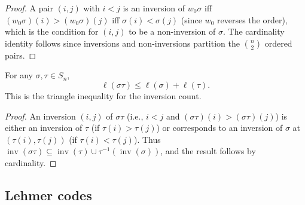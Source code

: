 \begin{proof}
\leanok
A pair $(i,j)$ with $i < j$ is an inversion of $w_0 \sigma$ iff
$(w_0 \sigma)(i) > (w_0 \sigma)(j)$ iff $\sigma(i) < \sigma(j)$
(since $w_0$ reverses the order), which is the condition for $(i,j)$
to be a non-inversion of $\sigma$.
The cardinality identity follows since inversions and non-inversions
partition the $\binom{n}{2}$ ordered pairs.
\end{proof}

\begin{lemma}
\label{lem.perm.invCount_mul_le}
\leanhelper
\leanok
For any $\sigma, \tau \in S_n$,
\[
\ell(\sigma \tau) \leq \ell(\sigma) + \ell(\tau).
\]
This is the triangle inequality for the inversion count.
\end{lemma}

\begin{proof}
\leanok
An inversion $(i,j)$ of $\sigma \tau$ (i.e., $i < j$ and $(\sigma\tau)(i) > (\sigma\tau)(j)$)
is either an inversion of $\tau$ (if $\tau(i) > \tau(j)$) or corresponds to an
inversion of $\sigma$ at $(\tau(i), \tau(j))$ (if $\tau(i) < \tau(j)$).
Thus $\operatorname{inv}(\sigma\tau) \subseteq \operatorname{inv}(\tau) \cup \tau^{-1}(\operatorname{inv}(\sigma))$,
and the result follows by cardinality.
\end{proof}

\subsection{Lehmer codes}

